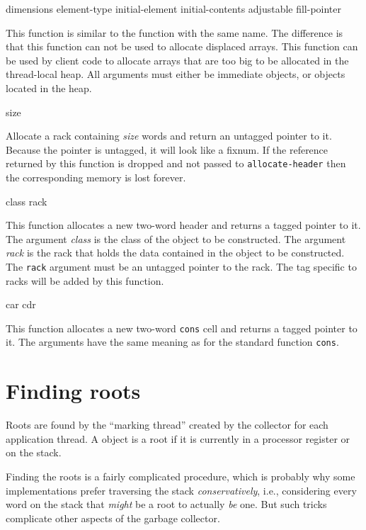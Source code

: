  {dimensions \key element-type initial-element
  initial-contents adjustable fill-pointer}

This function is similar to the \commonlisp{} function with the same
name.  The difference is that this function can not be used to
allocate displaced arrays.  This function can be used by client code
to allocate arrays that are too big to be allocated in the
thread-local heap.  All arguments must either be immediate objects, or
objects located in the heap.

 {size}

Allocate a rack containing \textit{size} words and return an untagged
pointer to it.  Because the pointer is untagged, it will look like a
fixnum.  If the reference returned by this function is dropped and not
passed to \texttt{allocate-header} then the corresponding memory is
lost forever.

 {class rack}

This function allocates a new two-word header and returns a tagged
pointer to it.  The argument \textit{class} is the class of the object
to be constructed.  The argument \textit{rack} is the rack that holds
the data contained in the object to be constructed.  The \texttt{rack}
argument must be an untagged pointer to the rack.  The tag specific to
racks will be added by this function.

 {car cdr}

This function allocates a new two-word \texttt{cons} cell and returns
a tagged pointer to it.  The arguments have the same meaning as for
the standard \commonlisp{} function \texttt{cons}.

\section{Finding roots}
\label{sec-garbage-collection-finding-roots}

Roots are found by the ``marking thread'' created by the collector for
each application thread.  A \commonlisp{} object is a root if it is
currently in a processor register or on the stack.

Finding the roots is a fairly complicated procedure, which is probably
why some implementations prefer traversing the stack
\emph{conservatively}, i.e., considering every word on the stack that
\emph{might} be a root to actually \emph{be} one.  But such tricks
complicate other aspects of the garbage collector.

